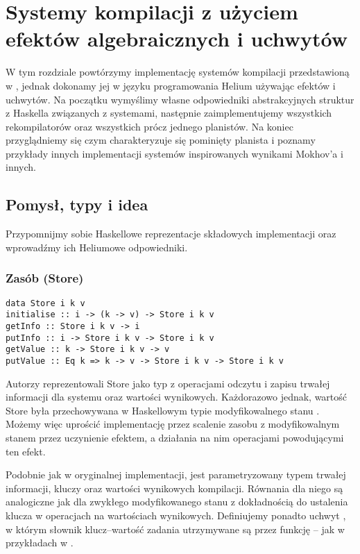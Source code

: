 
\chapter{Systemy kompilacji z użyciem efektów algebraicznych i uchwytów}
\label{chapter-bsue}

W tym rozdziale powtórzymy implementację systemów kompilacji przedstawioną w \BSaLC\cite{mokhov2018build}, jednak dokonamy jej w języku programowania Helium używając efektów i uchwytów. Na początku wymyślimy własne odpowiedniki abstrakcyjnych struktur z Haskella związanych z systemami, następnie zaimplementujemy wszystkich rekompilatorów oraz wszystkich prócz jednego planistów. Na koniec przyglądniemy się czym charakteryzuje się pominięty planista i poznamy przykłady innych implementacji systemów inspirowanych wynikami Mokhov'a i innych.

\section{Pomysł, typy i idea}

Przypomnijmy sobie Haskellowe reprezentacje składowych implementacji oraz wprowadźmy ich Heliumowe odpowiedniki.

\subsection{Zasób (Store)}

\begin{lstlisting}[style=haskell-style]
data Store i k v
initialise :: i -> (k -> v) -> Store i k v
getInfo :: Store i k v -> i
putInfo :: i -> Store i k v -> Store i k v
getValue :: k -> Store i k v -> v
putValue :: Eq k => k -> v -> Store i k v -> Store i k v
\end{lstlisting}

Autorzy \BSaLC\cite{mokhov2018build} reprezentowali Store jako typ z operacjami odczytu i zapisu trwałej informacji dla systemu oraz wartości wynikowych. Każdorazowo jednak, wartość Store była przechowywana w Haskellowym typie modyfikowalnego stanu . Możemy więc uprościć implementację przez scalenie zasobu z modyfikowalnym stanem przez uczynienie  efektem, a działania na nim operacjami powodującymi ten efekt.



Podobnie jak  w oryginalnej implementacji,  jest parametryzowany typem trwałej informacji, kluczy oraz wartości wynikowych kompilacji. Równania dla niego są analogiczne jak dla zwykłego modyfikowanego stanu z dokładnością do ustalenia klucza w operacjach na wartościach wynikowych. Definiujemy ponadto uchwyt , w którym słownik klucz--wartość zadania utrzymywane są przez funkcję -- jak w przykładach w \BSaLC{}.

